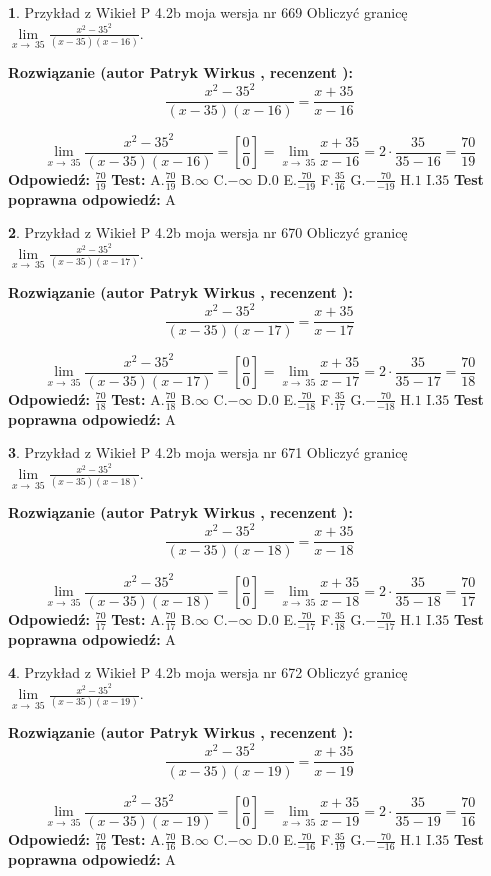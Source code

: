 \documentclass[12pt, a4paper]{article}
\theoremstyle{definition} %
\newtheorem{zad}{}
\newcommand{\zadStart}[1]{\begin{zad}#1\newline}
\newcommand{\zadStop}{\end{zad}}
\newcommand{\rozwStart}[2]{\noindent \textbf{Rozwiązanie (autor #1 , recenzent #2): }\newline}
\newcommand{\rozwStop}{\newline}
\newcommand{\odpStart}{\noindent \textbf{Odpowiedź:}\newline}
\newcommand{\odpStop}{\newline}
\newcommand{\testStart}{\noindent \textbf{Test:}\newline}
\newcommand{\testStop}{\newline}
\newcommand{\kluczStart}{\noindent \textbf{Test poprawna odpowiedź:}\newline}
\newcommand{\kluczStop}{\newline}
\begin{document}
\zadStart{Przykład z Wikieł P 4.2b moja wersja nr 669}
Obliczyć granicę $\lim\limits_{x\to\ 35}\frac{x^{2}-35^{2}}{(x-35)(x-16)}$.
\zadStop
\rozwStart{Patryk Wirkus}{}
$$\frac{x^{2}-35^{2}}{(x-35)(x-16)}=\frac{x+35}{x-16}$$

$$\lim\limits_{x\to\ 35}\frac{x^{2}-35^{2}}{(x-35)(x-16)}=[\frac{0}{0}]=\lim\limits_{x\to\ 35}\frac{x+35}{x-16}=2 \cdot \frac{35}{35-16} = \frac{70}{19}$$
\rozwStop
\odpStart
$\frac{70}{19}$
\odpStop
\testStart
A.$\frac{70}{19}$
B.$\infty$
C.$-\infty$
D.$0$
E.$\frac{70}{-19}$
F.$\frac{35}{16}$
G.$-\frac{70}{-19}$
H.$1$
I.$35$
\testStop
\kluczStart
A
\kluczStop



\zadStart{Przykład z Wikieł P 4.2b moja wersja nr 670}
Obliczyć granicę $\lim\limits_{x\to\ 35}\frac{x^{2}-35^{2}}{(x-35)(x-17)}$.
\zadStop
\rozwStart{Patryk Wirkus}{}
$$\frac{x^{2}-35^{2}}{(x-35)(x-17)}=\frac{x+35}{x-17}$$

$$\lim\limits_{x\to\ 35}\frac{x^{2}-35^{2}}{(x-35)(x-17)}=[\frac{0}{0}]=\lim\limits_{x\to\ 35}\frac{x+35}{x-17}=2 \cdot \frac{35}{35-17} = \frac{70}{18}$$
\rozwStop
\odpStart
$\frac{70}{18}$
\odpStop
\testStart
A.$\frac{70}{18}$
B.$\infty$
C.$-\infty$
D.$0$
E.$\frac{70}{-18}$
F.$\frac{35}{17}$
G.$-\frac{70}{-18}$
H.$1$
I.$35$
\testStop
\kluczStart
A
\kluczStop



\zadStart{Przykład z Wikieł P 4.2b moja wersja nr 671}
Obliczyć granicę $\lim\limits_{x\to\ 35}\frac{x^{2}-35^{2}}{(x-35)(x-18)}$.
\zadStop
\rozwStart{Patryk Wirkus}{}
$$\frac{x^{2}-35^{2}}{(x-35)(x-18)}=\frac{x+35}{x-18}$$

$$\lim\limits_{x\to\ 35}\frac{x^{2}-35^{2}}{(x-35)(x-18)}=[\frac{0}{0}]=\lim\limits_{x\to\ 35}\frac{x+35}{x-18}=2 \cdot \frac{35}{35-18} = \frac{70}{17}$$
\rozwStop
\odpStart
$\frac{70}{17}$
\odpStop
\testStart
A.$\frac{70}{17}$
B.$\infty$
C.$-\infty$
D.$0$
E.$\frac{70}{-17}$
F.$\frac{35}{18}$
G.$-\frac{70}{-17}$
H.$1$
I.$35$
\testStop
\kluczStart
A
\kluczStop



\zadStart{Przykład z Wikieł P 4.2b moja wersja nr 672}
Obliczyć granicę $\lim\limits_{x\to\ 35}\frac{x^{2}-35^{2}}{(x-35)(x-19)}$.
\zadStop
\rozwStart{Patryk Wirkus}{}
$$\frac{x^{2}-35^{2}}{(x-35)(x-19)}=\frac{x+35}{x-19}$$

$$\lim\limits_{x\to\ 35}\frac{x^{2}-35^{2}}{(x-35)(x-19)}=[\frac{0}{0}]=\lim\limits_{x\to\ 35}\frac{x+35}{x-19}=2 \cdot \frac{35}{35-19} = \frac{70}{16}$$
\rozwStop
\odpStart
$\frac{70}{16}$
\odpStop
\testStart
A.$\frac{70}{16}$
B.$\infty$
C.$-\infty$
D.$0$
E.$\frac{70}{-16}$
F.$\frac{35}{19}$
G.$-\frac{70}{-16}$
H.$1$
I.$35$
\testStop
\kluczStart
A
\kluczStop
\end{document}

